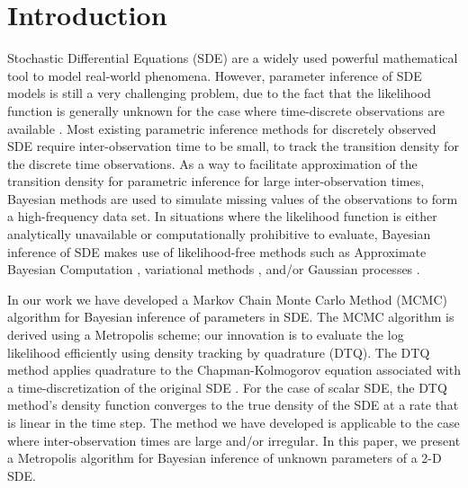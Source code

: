 \documentclass[graybox]{svmult}
\begin{document}
\section{Introduction}
\label{sec:1}
Stochastic Differential Equations (SDE) are a widely used powerful mathematical tool to model real-world phenomena. However, parameter inference of SDE models is still a 
very challenging problem, due to the fact that the likelihood function is generally unknown for the case where time-discrete observations are available \cite{sorensen2004parametric, iacus2009simulation, fuchs2013inference}. Most existing parametric inference methods for discretely observed SDE require inter-observation time to be small, to track the transition density for the discrete time observations. As a way to facilitate approximation of the transition density for parametric inference for large inter-observation times, Bayesian methods are used to simulate missing values of the observations to form a high-frequency data set. In situations where the likelihood function is either analytically unavailable or computationally prohibitive to evaluate, Bayesian inference of SDE makes use of likelihood-free methods such as Approximate Bayesian Computation \cite{Picchini2014}, variational methods \cite{Archambeau2007a, Vrettas2015}, and/or Gaussian processes \cite{Archambeau2007, Ruttor2013}.


In our work we have developed a Markov Chain Monte Carlo Method (MCMC) algorithm for Bayesian inference of parameters in SDE.  The MCMC algorithm is derived using a Metropolis scheme; our innovation is to evaluate the log likelihood efficiently using density tracking by quadrature (DTQ).  The DTQ method applies quadrature to the Chapman-Kolmogorov equation associated with a time-discretization of the original SDE \cite{BhatMadu2016}. For the case of scalar SDE, the DTQ method's density function converges to the true density of the SDE at a rate that is linear in the time step.  The method we have developed is applicable to the case where inter-observation times are large and/or irregular.  In this paper, we present a Metropolis algorithm for Bayesian inference of unknown parameters of a 2-D SDE.
\end{document}
